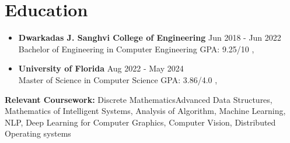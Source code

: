 \documentclass[a4paper,10pt]{article}
\begin{document}
\section*{Education}
\vspace{-3pt}
\begin{itemize}
    \item \textbf{Dwarkadas J. Sanghvi College of Engineering} \hfill Jun 2018 - Jun 2022 \\
Bachelor of Engineering in Computer Engineering \textbar{} GPA: 9.25/10 \hfill , 
\vspace{4pt}
\item \textbf{University of Florida} \hfill Aug 2022 - May 2024 \\
Master of Science in Computer Science \textbar{} GPA: 3.86/4.0 \hfill , 

\end{itemize}
\vspace{-3pt}
{\small\textbf{Relevant Coursework:} Discrete MathematicsAdvanced Data Structures, Mathematics of Intelligent Systems, Analysis of Algorithm, Machine Learning, NLP, Deep Learning for Computer Graphics, Computer Vision, Distributed Operating systems}
\end{document}
